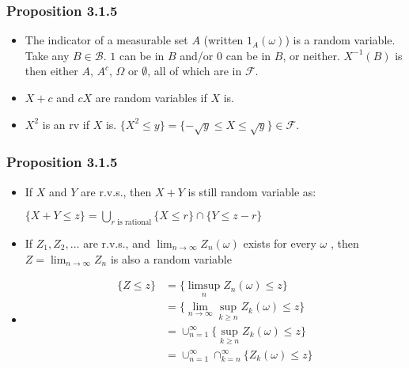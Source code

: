 \documentclass[handout]{beamer}
\begin{document}
\frame
{
  \frametitle{Proposition 3.1.5}

   \begin{itemize}

\item<1->  The indicator of a measurable set $A$ (written $1_A(\omega)$) is a random variable. Take any $B \in \mathcal{B}$. $1$ can be in $B$ and/or $0$ can be in $B$, or neither. $X^{-1}(B)$ is then either $A$, $A^c$, $\Omega$ or $\emptyset$, all of which are in $\mathcal{F}$.  

\item<2-> $X+c$ and $cX$ are random variables if $X$ is.

\item<3-> $X^2$ is an rv if $X$ is. $\{X^2 \le y\} = \{ - \sqrt{y} \le X \le \sqrt{y} \} \in \mathcal{F}$.
                                        
                 \end{itemize}
}

\frame
{
  \frametitle{Proposition 3.1.5}

   \begin{itemize}

    \item<1->  If $X$ and $Y$ are r.v.s., then $X+Y$ is still random variable as:
              
                  $\{X+Y\leq z\}=\bigcup_{r \text{ is rational}} \{X\leq r\} \cap \{Y\leq z-r\} $
                 
    \item<3->  If $Z_1, Z_2, \ldots$ are r.v.s., and $\lim_{n\rightarrow \infty} Z_n(\omega)$ exists for every $\omega$ , then $Z=\lim_{n\rightarrow \infty} Z_n$ is also a random variable
                                  
\item<3->[-]  
\begin{align*}
\{Z\leq z\} &= \{ \limsup_{n} Z_n(\omega) \leq z\} \\
&= \{ \lim_{n\to\infty} \sup_{k \ge n} Z_k(\omega) \leq z\} \\
&= \cup_{n =1}^{\infty} \{  \sup_{k \ge n} Z_k(\omega) \leq z\} \\
&= \cup_{n =1}^{\infty} \cap_{k=n}^{\infty} \{  Z_k(\omega) \leq z\}
\end{align*}

%                   

\end{itemize}
}
\end{document}
